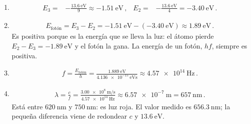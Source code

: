 \documentclass[12pt, a4paper]{article}
\begin{document}
\begin{solution}
\begin{enumerate}
    \item
    \begin{align}
        E_3 =& -\frac{\qty{13.6}{\electronvolt}}{9} \approx \qty{-1.51}{\electronvolt}\,, &
        E_2 =& -\frac{\qty{13.6}{\electronvolt}}{4} = \qty{-3.40}{\electronvolt}\,.
    \end{align}
    \item
    \begin{align}
        E_{\text{fotón}} = E_3 - E_2 = \qty{-1.51}{\electronvolt} - (\qty{-3.40}{\electronvolt}) \approx \qty{1.89}{\electronvolt}\,.
    \end{align}
    Es positiva porque es la energía que se lleva la luz: el átomo pierde $E_2 - E_3 = \qty{-1.89}{\electronvolt}$ y el fotón la gana. La energía de un fotón, $hf$, siempre es positiva.
    \item
    \begin{align}
        f = \frac{E_{\text{fotón}}}{h} = \frac{\qty{1.889}{\electronvolt}}{\qty{4.136e-15}{\electronvolt\second}} \approx \qty{4.57e14}{\hertz}\,.
    \end{align}
    \item
    \begin{align}
        \lambda = \frac{c}{f} = \frac{\qty{3.00e8}{\meter\per\second}}{\qty{4.57e14}{\hertz}} \approx \qty{6.57e-7}{\meter} = \qty{657}{\nano\meter}\,.
    \end{align}
    Está entre $\qty{620}{\nano\meter}$ y $\qty{750}{\nano\meter}$: es luz roja. El valor medido es $\qty{656.3}{\nano\meter}$; la pequeña diferencia viene de redondear $c$ y $\qty{13.6}{\electronvolt}$.
\end{enumerate}
\end{solution}
\end{document}

